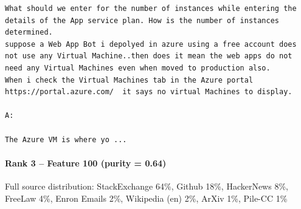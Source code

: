 \begin{verbatim}
What should we enter for the number of instances while entering the details of the App service plan. How is the number of instances determined.
suppose a Web App Bot i depolyed in azure using a free account does not use any Virtual Machine..then does it mean the web apps do not need any Virtual Machines even when moved to production also.
When i check the Virtual Machines tab in the Azure portal https://portal.azure.com/  it says no virtual Machines to display.

A:

The Azure VM is where yo ...

\end{verbatim}

\paragraph*{Rank 3 -- Feature 100 (purity = 0.64)}

Full source distribution: StackExchange 64\%, Github 18\%, HackerNews 8\%, FreeLaw 4\%, Enron Emails 2\%, Wikipedia (en) 2\%, ArXiv 1\%, Pile-CC 1\%

